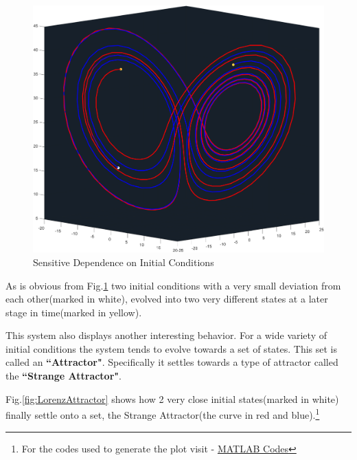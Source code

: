 \documentclass[14pts]{article}
\begin{document}
    \begin{figure}[h]
        \centering
        \includegraphics[width = \textwidth]{Images/Lorenz_Divergence.png}
        \caption{Sensitive Dependence on Initial Conditions}
        \label{fig:LorenzDiverge}
    \end{figure}

	As is obvious from Fig.\ref{fig:LorenzDiverge} two initial conditions with a very small deviation from each other(marked in white), evolved into two very different states at a later stage in time(marked in yellow).

    This system also displays another interesting behavior. For a wide variety of initial conditions the system tends to evolve towards a set of states. This set is called an \textbf{``Attractor"}.
    Specifically it settles towards a type of attractor called the \textbf{``Strange Attractor"}.

    Fig.\ref{fig:LorenzAttractor} shows how 2 very close initial states(marked in white) finally settle onto a set, the Strange Attractor(the curve in red and blue).\footnote[2]{For the codes used to generate the plot visit - \href{https://github.com/atharvaaalok/AS2101_Mandelbrot_Lorenz/tree/main/MATLAB}{MATLAB Codes}}
\end{document}

